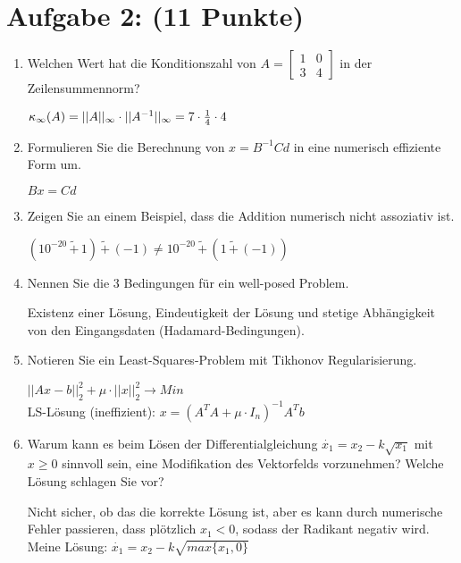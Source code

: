 \documentclass[12pt]{article}
\begin{document}
\section*{Aufgabe 2: (11 Punkte)}
\begin{enumerate}
	\item Welchen Wert hat die Konditionszahl von $A=\begin{bmatrix}
	1 & 0 \\ 3 & 4
	 \end{bmatrix}$ in der Zeilensummennorm?
	 \begin{solution}
	$\kappa_{\infty}(A) = ||A||_{\infty}\cdot||A^{-1}||_{\infty} = 7 \cdot \frac{1}{4} \cdot 4$
	\end{solution}
	
	\item Formulieren Sie die Berechnung von $x = B^{-1}Cd$ in eine numerisch effiziente Form um.
	\begin{solution}
		$Bx = Cd\qquad $
	\end{solution}
	
	\item Zeigen Sie an einem Beispiel, dass die Addition numerisch nicht assoziativ ist.
	
\newcommand{\numPlus}{\,\widetilde{+}\,}
	\begin{solution}
		$(10^{-20} \numPlus 1) \numPlus (-1) \neq 10^{-20} \numPlus (1 \numPlus (-1))$
	\end{solution}
	
	\item Nennen Sie die 3 Bedingungen für ein well-posed Problem.
	
	\begin{solution}
	Existenz einer Lösung, Eindeutigkeit der Lösung und stetige Abhängigkeit von den Eingangsdaten (Hadamard-Bedingungen).
	\end{solution}
	
	\item Notieren Sie ein Least-Squares-Problem mit Tikhonov Regularisierung.\\
		\begin{solution}
			$||Ax - b||_2^2 + \mu \cdot ||x||_2^2 \rightarrow Min$\\
			LS-Lösung (ineffizient): $x = (A^TA + \mu\cdot I_n)^{-1} A^Tb$
		\end{solution}

	
	\item Warum kann es beim Lösen der Differentialgleichung $\dot{x_1} = x_2 - k \sqrt{x_1}$ mit \mbox{$x\geq 0$} sinnvoll sein, eine Modifikation des Vektorfelds vorzunehmen? Welche Lösung schlagen Sie vor?
	\begin{solution}
		Nicht sicher, ob das die korrekte Lösung ist, aber es kann durch numerische Fehler passieren, dass plötzlich $x_1 < 0$, sodass der Radikant negativ wird.\\
		Meine Lösung: $\dot{x_1} = x_2 - k\sqrt{max\{x_1, 0\}}$
	\end{solution}


\end{enumerate}
\end{document}
